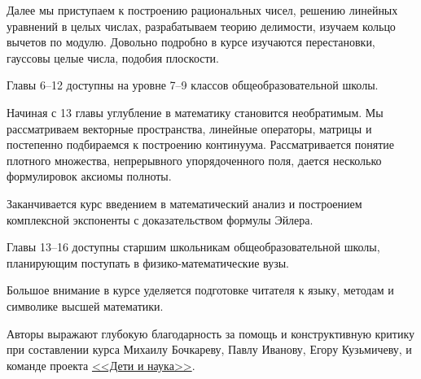 Далее мы приступаем к построению рациональных чисел, решению линейных уравнений в целых числах, разрабатываем теорию делимости, изучаем кольцо вычетов по модулю. Довольно подробно в курсе изучаются перестановки, гауссовы целые числа, подобия плоскости.

Главы 6--12 доступны на уровне 7--9 классов общеобразовательной школы.

Начиная с 13 главы углубление в математику становится необратимым. Мы рассматриваем векторные пространства, линейные операторы, матрицы и постепенно подбираемся к построению континуума. Рассматривается понятие плотного множества, непрерывного упорядоченного поля, дается несколько формулировок аксиомы полноты.

Заканчивается курс введением в математический анализ и построением комплексной экспоненты с доказательством формулы Эйлера.

Главы 13--16 доступны старшим школьникам общеобразовательной школы, планирующим поступать в физико-математические вузы.


Большое внимание в курсе уделяется подготовке читателя к языку, методам и символике высшей математики. 

Авторы выражают глубокую благодарность за помощь и конструктивную критику при составлении курса Михаилу Бочкареву, Павлу Иванову, Егору Кузьмичеву,  и команде проекта \href{http://childrenscience.ru/}{<<Дети и наука>>}.





